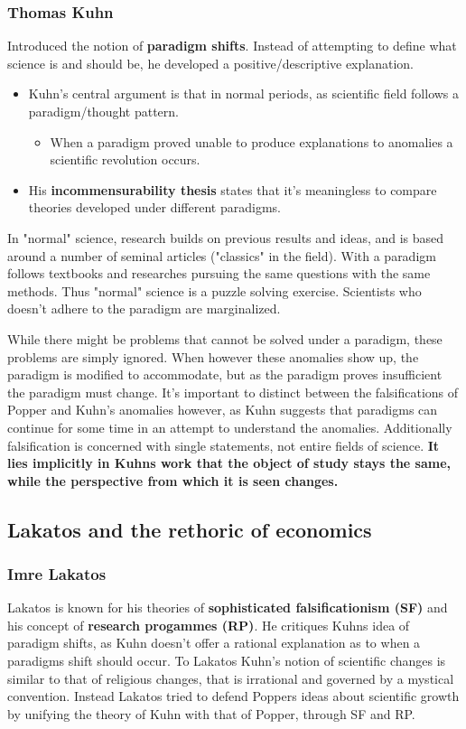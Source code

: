\documentclass[12pt, a4paper]{article}
\begin{document}
\begin{multicols}{2}
\subsubsection{Thomas Kuhn}
Introduced the notion of \textbf{paradigm shifts}. Instead of attempting to define what science is and should be, he developed a positive/descriptive explanation. 
\begin{itemize}
\item Kuhn's central argument is that in normal periods, as scientific field follows a paradigm/thought pattern. 
\begin{itemize}
\item When a paradigm proved unable to produce explanations to anomalies a scientific revolution occurs. 
\end{itemize}
\item His \textbf{incommensurability thesis} states that it's meaningless to compare theories developed under different paradigms.
\end{itemize}
In "normal" science, research builds on previous results and ideas, and is based around a number of seminal articles ("classics" in the field). With a paradigm follows textbooks and researches pursuing the same questions with the same methods. Thus "normal" science is a puzzle solving exercise. Scientists who doesn't adhere to the paradigm are marginalized. 

While there might be problems that cannot be solved under a paradigm, these problems are simply ignored. When however these anomalies show up, the paradigm is modified to accommodate, but as the paradigm proves insufficient the paradigm must change. It's important to distinct between the falsifications of Popper and Kuhn's anomalies however, as Kuhn suggests that paradigms can continue for some time in an attempt to understand the anomalies. Additionally falsification is concerned with single statements, not entire fields of science. \textbf{It lies implicitly in Kuhns work that the object of study stays the same, while the perspective from which it is seen changes.}

\subsection{Lakatos and the rethoric of economics}
\subsubsection{Imre Lakatos}
Lakatos is known for his theories of \textbf{sophisticated falsificationism (SF)} and his concept of \textbf{research progammes (RP)}. He critiques Kuhns idea of paradigm shifts, as Kuhn doesn't offer a rational explanation as to when a paradigms shift should occur. To Lakatos Kuhn's notion of scientific changes is similar to that of religious changes, that is irrational and governed by a mystical convention. Instead Lakatos tried to defend Poppers ideas about scientific growth by unifying the theory of Kuhn with that of Popper, through SF and RP.


\end{multicols}
\end{document}
